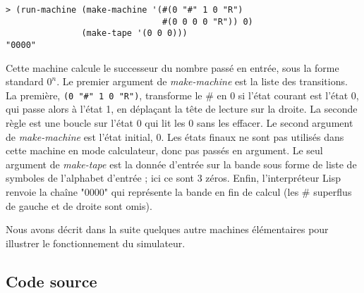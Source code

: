 \documentclass[a4paper, 10pt]{article}
\begin{document}
\begin{lstlisting}
> (run-machine (make-machine '(#(0 "#" 1 0 "R")
                               #(0 0 0 0 "R")) 0)
               (make-tape '(0 0 0)))
"0000"
\end{lstlisting}

Cette machine calcule le successeur du nombre passé en entrée, sous la
forme standard $0^n$. Le premier argument de \textit{make-machine} est
la liste des transitions. La première, \lstinline{(0 "#" 1 0 "R")}, transforme
le \# en 0 si l'état courant est l'état 0, qui passe alors à l'état 1, en
déplaçant la tête de lecture sur la droite. La seconde règle est une
boucle sur l'état 0 qui lit les 0 sans les effacer. Le second argument
de \textit{make-machine} est l'état initial, 0. Les états finaux ne
sont pas utilisés dans cette machine en mode calculateur, donc pas
passés en argument. Le seul argument de \textit{make-tape} est la
donnée d'entrée sur la bande sous forme de liste de symboles de
l'alphabet d'entrée ; ici ce sont 3 zéros. Enfin, l'interpréteur Lisp
renvoie la chaîne "0000" qui représente la bande en fin de calcul
(les \# superflus de gauche et de droite sont omis).

Nous avons décrit dans la suite quelques autre machines élémentaires
pour illustrer le fonctionnement du simulateur.



\subsection*{Code source}


\end{document}
